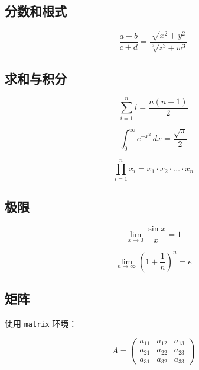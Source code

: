 \subsection{分数和根式}

\begin{equation}
  \frac{a+b}{c+d} = \frac{\sqrt{x^2+y^2}}{\sqrt[3]{z^3+w^3}}
\end{equation}

\subsection{求和与积分}

\begin{equation}
  \sum_{i=1}^{n} i = \frac{n(n+1)}{2}
\end{equation}

\begin{equation}
  \int_0^\infty e^{-x^2} \, dx = \frac{\sqrt{\pi}}{2}
\end{equation}

\begin{equation}
  \prod_{i=1}^{n} x_i = x_1 \cdot x_2 \cdot \ldots \cdot x_n
\end{equation}

\subsection{极限}

\begin{equation}
  \lim_{x \to 0} \frac{\sin x}{x} = 1
\end{equation}

\begin{equation}
  \lim_{n \to \infty} \left(1 + \frac{1}{n}\right)^n = e
\end{equation}

\subsection{矩阵}

使用 \texttt{matrix} 环境：

\begin{equation}
  A = \begin{pmatrix}
    a_{11} & a_{12} & a_{13} \\
    a_{21} & a_{22} & a_{23} \\
    a_{31} & a_{32} & a_{33}
  \end{pmatrix}
\end{equation}

